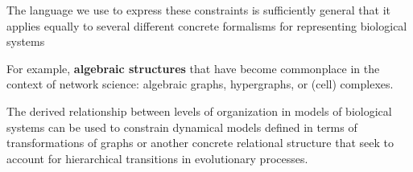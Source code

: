 \begin{frame}
\begin{block}{}
The language we use to express these constraints is sufficiently general that it applies equally to several different concrete formalisms for representing biological systems
\end{block}
\begin{block}{}
For example, \textbf{algebraic structures} that have become commonplace in the context of network science: algebraic graphs, hypergraphs, or (cell) complexes. 
\end{block}
\begin{block}{}
The derived relationship between levels of organization in models of biological systems can be used to constrain dynamical models defined in terms of transformations of graphs or another concrete relational structure that seek to account for hierarchical transitions in evolutionary processes.
\end{block}
\end{frame}
